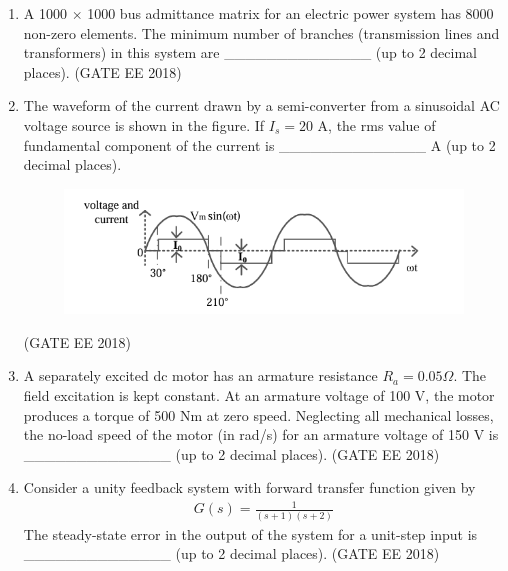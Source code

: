 \documentclass[journal,12pt,onecolumn]{IEEEtran}
\theoremstyle{remark}
\begin{document}
\begin{enumerate}
    \item A 1000 $\times$ 1000 bus admittance matrix for an electric power system has 8000 non-zero elements. The minimum number of branches (transmission lines and transformers) in this system are \_\_\_\_\_\_\_\_\_\_\_\_\_\_ (up to 2 decimal places).
   \hfill{(GATE EE 2018)} 

    \item The waveform of the current drawn by a semi-converter from a sinusoidal AC voltage source is shown in the figure. If $I_s = 20$ A, the rms value of fundamental component of the current is \_\_\_\_\_\_\_\_\_\_\_\_\_\_ A (up to 2 decimal places).
    \begin{figure}[H]
    \centering
    \includegraphics[]{figs/Q.23.png}
    \caption{}
    \label{fig:7}
\end{figure}
   \hfill{(GATE EE 2018)} 
    
    \item A separately excited dc motor has an armature resistance $R_{a} = 0.05 \Omega$. The field excitation is kept constant. At an armature voltage of 100 V, the motor produces a torque of 500 Nm at zero speed. Neglecting all mechanical losses, the no-load speed of the motor (in rad/s) for an armature voltage of 150 V is \_\_\_\_\_\_\_\_\_\_\_\_\_\_ (up to 2 decimal places).
   \hfill{(GATE EE 2018)} 
    
    \item Consider a unity feedback system with forward transfer function given by
    \begin{align*}
     G(s) = \frac{1}{(s+1)(s+2)} 
    \end{align*}
    The steady-state error in the output of the system for a unit-step input is \_\_\_\_\_\_\_\_\_\_\_\_\_\_ (up to 2 decimal places).
\hfill{(GATE EE 2018)}


\end{enumerate}
\end{document}
